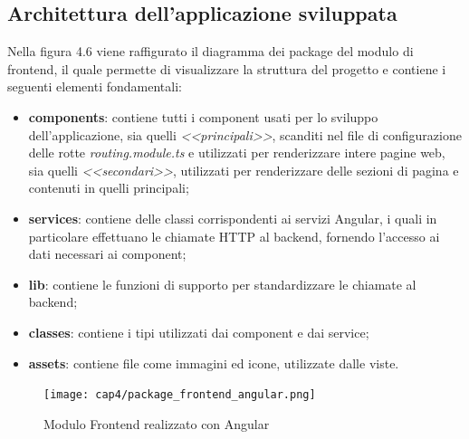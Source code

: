 \subsection{Architettura dell'applicazione sviluppata}
Nella figura 4.6 viene raffigurato il diagramma dei package del modulo di \gls{frontend}, il quale permette di visualizzare la struttura del progetto e contiene i seguenti  elementi fondamentali:
\begin{itemize}
	\item \textbf{components}: contiene tutti i component usati per lo sviluppo dell'applicazione, sia quelli \textit{<<principali>>}, scanditi nel file di configurazione delle rotte \textsl{routing.module.ts} e utilizzati per renderizzare intere pagine web, sia quelli \textit{<<secondari>>}, utilizzati per renderizzare delle sezioni di pagina e contenuti in quelli principali;
	\item \textbf{services}: contiene delle classi corrispondenti ai servizi Angular, i quali in particolare effettuano le chiamate HTTP al \gls{backend}, fornendo l'accesso ai dati necessari ai component;
	\item \textbf{lib}: contiene le funzioni di supporto per standardizzare le chiamate al \gls{backend};
	\item \textbf{classes}: contiene i tipi utilizzati dai component e dai service;
	\item \textbf{assets}: contiene file come immagini ed icone, utilizzate dalle viste.
\end{itemize}
\begin{figure}[!h] 
    \centering 
    \texttt{[image: cap4/package\_frontend\_angular.png]} 
    \caption{Modulo Frontend realizzato con Angular}
\end{figure}
